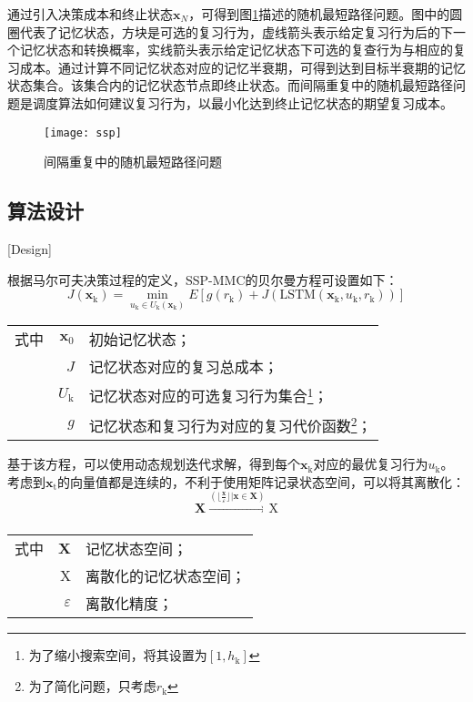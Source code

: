 通过引入决策成本和终止状态$\bm x_N$，可得到图\ref{fig:ssp}描述的随机最短路径问题。图中的圆圈代表了记忆状态，方块是可选的复习行为，虚线箭头表示给定复习行为后的下一个记忆状态和转换概率，实线箭头表示给定记忆状态下可选的复查行为与相应的复习成本。通过计算不同记忆状态对应的记忆半衰期，可得到达到目标半衰期的记忆状态集合。该集合内的记忆状态节点即终止状态。而间隔重复中的随机最短路径问题是调度算法如何建议复习行为，以最小化达到终止记忆状态的期望复习成本。

\begin{figure}[htbp]
    \centering
    \texttt{[image: ssp]}
    \caption{间隔重复中的随机最短路径问题}
    \label{fig:ssp}
\end{figure}

\subsection{算法设计}[Design]

根据马尔可夫决策过程的定义，SSP-MMC的贝尔曼方程可设置如下：
\begin{equation}
J(\bm x_\mathrm{k}) = \min\limits_{u_\mathrm{k} \in U_\mathrm{k}(\bm x_\mathrm{k})} E[g(r_\mathrm{k}) + J(\mathrm{LSTM}(\bm x_\mathrm{k},u_\mathrm{k},r_\mathrm{k}))]
\end{equation}
\begin{tabularx}{\textwidth}{@{}l@{\quad}r@{———}X@{}}
    式中&  $\bm x_0$ &初始记忆状态；\\
    & $J$ &记忆状态对应的复习总成本；\\
    & $U_\mathrm{k}$ &记忆状态对应的可选复习行为集合\footnote{为了缩小搜索空间，将其设置为$[1,h_\mathrm{k}]$}；\\
    & $g$ &记忆状态和复习行为对应的复习代价函数\footnote{为了简化问题，只考虑$r_\mathrm{k}$}；
\end{tabularx}\vspace{3.15bp}

基于该方程，可以使用动态规划迭代求解，得到每个$\bm x_\mathrm{k}$对应的最优复习行为$u_\mathrm{k}$。考虑到$\bm x_\mathrm{t}$的向量值都是连续的，不利于使用矩阵记录状态空间，可以将其离散化：
\begin{equation}
\bm X \xrightarrow[]{(\lfloor \frac{\bm x}{\varepsilon} \rfloor|\bm x \in \bm X)} \bm{\mathrm{X}}
\end{equation}
\begin{tabularx}{\textwidth}{@{}l@{\quad}r@{———}X@{}}
    式中& $\bm X$ &记忆状态空间；\\
    & $\bm{\mathrm{X}}$ &离散化的记忆状态空间；\\
    &  $\varepsilon$ &离散化精度；
\end{tabularx}\vspace{3.15bp}

